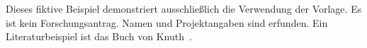 Dieses fiktive Beispiel demonstriert ausschließlich die Verwendung der Vorlage. Es ist kein Forschungsantrag. Namen und Projektangaben sind erfunden. Ein Literaturbeispiel ist das Buch von Knuth~\cite{knuth1984}.
